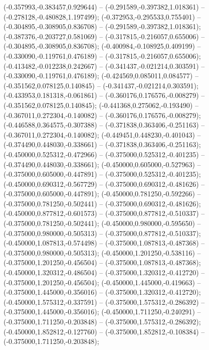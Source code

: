  (-0.357993,-0.383457,0.929644) -- (-0.291589,-0.397382,1.018361) -- (-0.278128,-0.480828,1.197499);
 (-0.372953,-0.295533,0.755401) -- (-0.304895,-0.308905,0.836708) -- (-0.291589,-0.397382,1.018361);
 (-0.387376,-0.203727,0.581069) -- (-0.317815,-0.216057,0.655006) -- (-0.304895,-0.308905,0.836708);
 (-0.400984,-0.108925,0.409199) -- (-0.330090,-0.119761,0.476189) -- (-0.317815,-0.216057,0.655006);
 (-0.413482,-0.012238,0.242667) -- (-0.341437,-0.021214,0.303591) -- (-0.330090,-0.119761,0.476189);
 (-0.424569,0.085011,0.084577) -- (-0.351562,0.078125,0.140845) -- (-0.341437,-0.021214,0.303591);
 (-0.433953,0.181318,-0.061861) -- (-0.360176,0.176576,-0.008279) -- (-0.351562,0.078125,0.140845);
 (-0.441368,0.275062,-0.193490) -- (-0.367011,0.272304,-0.140082) -- (-0.360176,0.176576,-0.008279);
 (-0.446588,0.364575,-0.307388) -- (-0.371838,0.363406,-0.251163) -- (-0.367011,0.272304,-0.140082);
 (-0.449451,0.448230,-0.401043) -- (-0.374490,0.448030,-0.338661) -- (-0.371838,0.363406,-0.251163);
 (-0.450000,0.525312,-0.472966) -- (-0.375000,0.525312,-0.401235) -- (-0.374490,0.448030,-0.338661);
 (-0.450000,0.605000,-0.527963) -- (-0.375000,0.605000,-0.447891) -- (-0.375000,0.525312,-0.401235);
 (-0.450000,0.690312,-0.567729) -- (-0.375000,0.690312,-0.481626) -- (-0.375000,0.605000,-0.447891);
 (-0.450000,0.781250,-0.592266) -- (-0.375000,0.781250,-0.502441) -- (-0.375000,0.690312,-0.481626);
 (-0.450000,0.877812,-0.601573) -- (-0.375000,0.877812,-0.510337) -- (-0.375000,0.781250,-0.502441);
 (-0.450000,0.980000,-0.595650) -- (-0.375000,0.980000,-0.505313) -- (-0.375000,0.877812,-0.510337);
 (-0.450000,1.087813,-0.574498) -- (-0.375000,1.087813,-0.487368) -- (-0.375000,0.980000,-0.505313);
 (-0.450000,1.201250,-0.538116) -- (-0.375000,1.201250,-0.456504) -- (-0.375000,1.087813,-0.487368);
 (-0.450000,1.320312,-0.486504) -- (-0.375000,1.320312,-0.412720) -- (-0.375000,1.201250,-0.456504);
 (-0.450000,1.445000,-0.419663) -- (-0.375000,1.445000,-0.356016) -- (-0.375000,1.320312,-0.412720);
 (-0.450000,1.575312,-0.337591) -- (-0.375000,1.575312,-0.286392) -- (-0.375000,1.445000,-0.356016);
 (-0.450000,1.711250,-0.240291) -- (-0.375000,1.711250,-0.203848) -- (-0.375000,1.575312,-0.286392);
 (-0.450000,1.852812,-0.127760) -- (-0.375000,1.852812,-0.108384) -- (-0.375000,1.711250,-0.203848);
